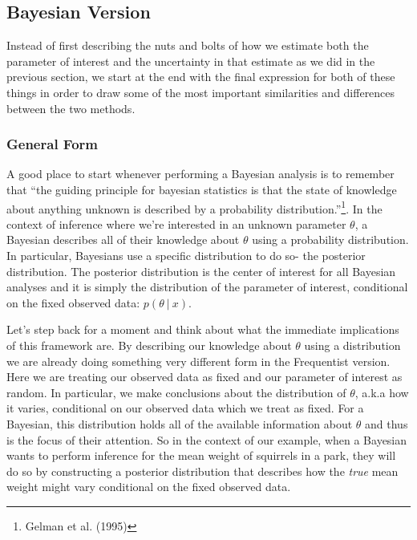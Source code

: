 \documentclass[12pt,twoside]{reedthesis}
\begin{document}
\hypertarget{bayesian-version}{%
\subsection{Bayesian Version}\label{bayesian-version}}

Instead of first describing the nuts and bolts of how we estimate both the parameter of interest and the uncertainty in that estimate as we did in the previous section, we start at the end with the final expression for both of these things in order to draw some of the most important similarities and differences between the two methods.

\hypertarget{general-form}{%
\subsubsection{General Form}\label{general-form}}

A good place to start whenever performing a Bayesian analysis is to remember that ``the guiding principle for bayesian statistics is that the state of knowledge about anything unknown is described by a probability distribution.''\footnote{Gelman et al. (1995)}. In the context of inference where we're interested in an unknown parameter \(\theta\), a Bayesian describes all of their knowledge about \(\theta\) using a probability distribution. In particular, Bayesians use a specific distribution to do so- the posterior distribution. The posterior distribution is the center of interest for all Bayesian analyses and it is simply the distribution of the parameter of interest, conditional on the fixed observed data: \(p(\theta \ | \ x)\).

Let's step back for a moment and think about what the immediate implications of this framework are. By describing our knowledge about \(\theta\) using a distribution we are already doing something very different form in the Frequentist version. Here we are treating our observed data as fixed and our parameter of interest as random. In particular, we make conclusions about the distribution of \(\theta\), a.k.a how it varies, conditional on our observed data which we treat as fixed. For a Bayesian, this distribution holds all of the available information about \(\theta\) and thus is the focus of their attention. So in the context of our example, when a Bayesian wants to perform inference for the mean weight of squirrels in a park, they will do so by constructing a posterior distribution that describes how the \emph{true} mean weight might vary conditional on the fixed observed data.
\end{document}
